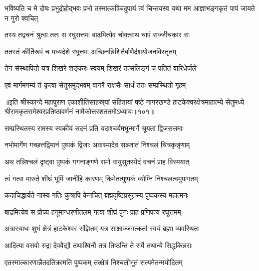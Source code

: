 \threelineshloka
{भविष्यति च मे दोषः प्रभुद्रोहोद्भवः प्रभो}
{तस्मात्कञ्चिदुपायं त्वं चिन्तयस्व यथा मम}
{आज्ञाभङ्गकृतं पापं जायते न गुरो क्वचित्}%

\twolineshloka
{तस्य तद्वचनं श्रुत्वा ततः स रघुसत्तमः}
{बाढमित्येव चोक्त्वाथ चापं सज्जीचकार सः}%

\twolineshloka
{ततस्तं कीर्तिरूपं च मध्यदेशे रघूत्तमः}
{अच्छिनन्निशितैर्बाणैर्दशयोजनविस्तृतम्}%

\twolineshloka
{तेन संस्थापितो यत्र शिखरे शङ्करः स्वयम्}
{शिखरं तत्सलिङ्गं च पतितं वारिधेर्जले}%

\twolineshloka
{एवं मार्गमगम्यं तं कृत्वा सेतुसमुद्भवम्}
{वानरै राक्षसैः सार्धं ततः सम्प्रस्थितो गृहम्}%

॥इति श्रीस्कान्दे महापुराण एकाशीतिसाहस्र्यां संहितायां षष्ठे नागरखण्डे हाटकेश्वरक्षेत्रमाहात्म्ये सेतुमध्ये श्रीरामकृतरामेश्वरप्रतिष्ठावर्णनं नामैकोत्तरशततमोऽध्यायः॥१०१॥

\resetShloka


\twolineshloka
{सम्प्रस्थितस्य रामस्य स्वकीयं सदनं प्रति}
{यदाश्चर्यमभून्मार्गे श्रूयतां द्विजसत्तमाः}%

\twolineshloka
{नभोमार्गेण गच्छत्तद्विमानं पुष्पकं द्विजाः}
{अकस्मादेव सञ्जातं निश्चलं चित्रकृन्नृणाम्}%

\twolineshloka
{अथ तन्निश्चलं दृष्ट्वा पुष्पकं गगनाङ्गणे}
{रामो वायुसुतस्येदं वचनं प्राह विस्मयात्}%

\twolineshloka
{त्वं गत्वा मारुते शीघ्रं भूमिं जानीहि कारणम्}
{किमेतत्पुष्पकं व्योम्नि निश्चलत्वमुपागतम्}%

\twolineshloka
{कदाचिद्धार्यते नास्य गतिः कुत्रापि केनचित्}
{ब्रह्मदृष्टिप्रसूतस्य पुष्पकस्य महात्मनः}%

\twolineshloka
{बाढमित्येव स प्रोच्य हनूमान्धरणीतलम्}
{गत्वा शीघ्रं पुनः प्राह प्रणिपत्य रघूत्तमम्}%

\twolineshloka
{अत्रास्याधः शुभं क्षेत्रं हाटकेश्वर संज्ञितम्}
{यत्र साक्षाज्जगत्कर्ता स्वयं ब्रह्मा व्यवस्थितः}%

\twolineshloka
{आदित्या वसवो रुद्रा देववैद्यौ तथाश्विनौ}
{तत्र तिष्ठन्ति ते सर्वे तथान्ये सिद्धकिन्नराः}%

\twolineshloka
{एतस्मात्कारणान्नैतदतिक्रामति पुष्पकम्}
{तत्क्षेत्रं निश्चलीभूतं सत्यमेतन्मयोदितम्}%


